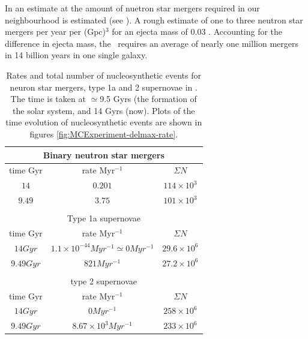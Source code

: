 In  an estimate at the amount of nuetron star mergers required in our neighbourhood is estimated (see ).
A rough estimate of one to three neutron star mergers per year per (Gpc)$^3$ for an ejecta mass of 0.03 \msol.
Accounting for the difference in ejecta mass, the \fiduccialomega\ requires an average of nearly one million mergers in 14 billion years in one single galaxy.

\begin{table}[h]
  \centering
  \begin{tabular}{|c|c|c|}
    \multicolumn{3}{c}{Binary neutron star mergers} \\ \hline
    time $\mathrm{Gyr}$ & rate $\mathrm{Myr^{-1}}$ & $\Sigma N$ \\ \hline 
    $14$ & $0.201$ & $114 \times 10^3$ \\ \hline 
    $9.49$ & $3.75$ & $101 \times 10^3$ \\ \hline
    \multicolumn{3}{c}{} \\
    \multicolumn{3}{c}{Type 1a supernovae} \\ \hline
    time $\mathrm{Gyr}$ & rate $\mathrm{Myr^{-1}}$ & $\Sigma N$ \\ \hline 
    $14 Gyr$ & $1.1 \times 10^{-44} Myr^{-1} \simeq 0 Myr^{-1}$ & $29.6 \times 10^{6}$ \\ \hline 
    $9.49 Gyr$ & $821 Myr^{-1}$ & $27.2 \times 10^{6}$ \\ \hline
    \multicolumn{3}{c}{} \\
    \multicolumn{3}{c}{type 2 supernovae} \\ \hline
    time $\mathrm{Gyr}$ & rate $\mathrm{Myr^{-1}}$ & $\Sigma N$ \\ \hline 
    $14 Gyr$ & $0 Myr^{-1}$ & $258 \times 10^{6}$ \\ \hline 
    $9.49 Gyr$ & $8.67 \times 10^{3} Myr^{-1}$ & $233 \times 10^{6}$ \\ \hline
  \end{tabular}
  \caption[Rates and numbers of nucleosynthetic events in \expone]{\label{tab:nucleosynthetic-events}
    Rates and total number of nucleosynthetic events for neuron star mergers, type 1a and 2 supernovae in \omegamodel.
    The time is taken at $\simeq$9.5 Gyrs (the formation of the solar system, and 14 Gyrs (now).
    Plots of the time evolution of nucleosynthetic events are shown in figures \ref{fig:MCExperiment-delmax-rate}.
  }
\end{table}

